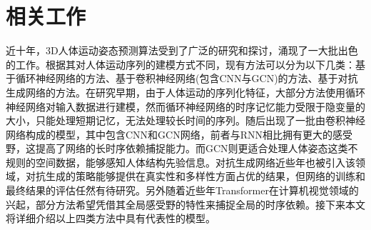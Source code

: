 \chapter{相关工作}


近十年，3D人体运动姿态预测算法受到了广泛的研究和探讨，涌现了一大批出色的工作。根据其对人体运动序列的建模方式不同，现有方法可以分为以下几类：基于循环神经网络的方法\parencite{fragkiadaki2015recurrent,jain2016structural,ghosh2017learning,martinez2017human,gui2018adversarial,tang2018long,gui2018few,guo2019human,liu2019towards,chiu2019action,gopalakrishnan2019neural,sang2020human,corona2020context,pavllo2020modeling}、基于卷积神经网络(包含CNN与GCN)的方法\parencite{aksan2019structured,mao2019learning,mao2020history,cui2020learning,li2020dynamic,li2021symbiotic,li2020multitask,liu2020multi,lebailly2020motion,dang2021msr,cui2021towards,Shi:AAAI2022,Shi:CVPR2021,Duan:AAAI2022,butepage2017deep,li2018convolutional,liu2020trajectorycnn}、基于对抗生成网络的方法\parencite{barsoum2018hp,kundu2019bihmp,hernandez2019human,jain2020gan,liu2021aggregated,cui2021efficient,gui2018adversarial,chao2020adversarial,lyu2021learning}。在研究早期，由于人体运动的序列化特征，大部分方法使用循环神经网络对输入数据进行建模，然而循环神经网络的时序记忆能力受限于隐变量的大小，只能处理短期记忆，无法处理较长时间的序列。随后出现了一批由卷积神经网络构成的模型，其中包含CNN和GCN网络，前者与RNN相比拥有更大的感受野，这提高了网络的长时序依赖捕捉能力。而GCN则更适合处理人体姿态这类不规则的空间数据，能够感知人体结构先验信息。对抗生成网络近些年也被引入该领域，对抗生成的策略能够提供在真实性和多样性方面占优的结果，但网络的训练和最终结果的评估任然有待研究。另外随着近些年Transformer在计算机视觉领域的兴起，部分方法希望凭借其全局感受野的特性来捕捉全局的时序依赖。接下来本文将详细介绍以上四类方法中具有代表性的模型。

